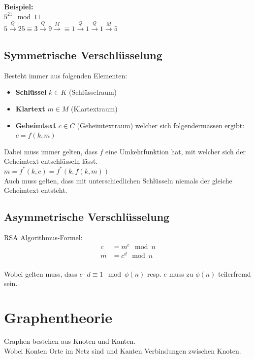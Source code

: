 \documentclass[12pt]{scrartcl}
\begin{document}
\textbf{Beispiel:}\\
$5^{21} \mod 11$\\
$5 \xrightarrow{Q} 25 \equiv 3 \xrightarrow{Q} 9 \xrightarrow{M} \equiv 1 \xrightarrow{Q} 1 \xrightarrow{Q} 1 \xrightarrow{M} 5$\\


\subsection{Symmetrische Verschlüsselung}
Besteht immer aus folgenden Elementen:
\begin{itemize}
    \item \textbf{Schlüssel} $k \in K$ (Schlüsselraum)
    \item \textbf{Klartext} $m \in M$ (Klartextraum)
    \item \textbf{Geheimtext} $c \in C$ (Geheimtextraum) welcher sich folgendermassen ergibt:
    $c = f(k, m)$
\end{itemize}

Dabei muss immer gelten, dass $f$ eine Umkehrfunktion hat, mit welcher sich der Geheimtext
entschlüsseln lässt.\\

$m = f^*(k, c) = f^*(k, f(k, m))$\\

Auch muss gelten, dass mit unterschiedlichen Schlüsseln niemals der gleiche Geheimtext entsteht.\\


\subsection{Asymmetrische Verschlüsselung}
RSA Algorithmus-Formel:\\

\begin{align*}
    c &= m^e \mod n\\
    m &= c^d \mod n\\
\end{align*}

Wobei gelten muss, dass $e \cdot d \equiv 1 \mod \phi(n)$ resp. $e$ muss zu $\phi(n)$ teilerfremd sein.\\


\newpage
\section{Graphentheorie}
Graphen bestehen aus Knoten und Kanten.\\
Wobei Konten Orte im Netz sind und Kanten Verbindungen zwischen Knoten.\\
\end{document}
